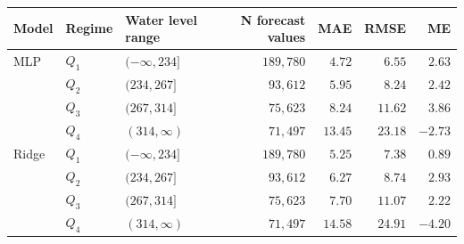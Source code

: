 \begin{tabularx}{\textwidth}{@{}llXrrrr@{}}
\toprule
\textbf{Model} & \textbf{Regime} & \textbf{Water level range} & \textbf{N forecast values} & \textbf{MAE} & \textbf{RMSE} & \textbf{ME} \\
\midrule
MLP & $Q_1$ & $(-\infty, 234]$ & $189{,}780$ & $4.72$ & $6.55$ & $2.63$ \\
\addlinespace
 & $Q_2$ & $(234, 267]$ & $93{,}612$ & $5.95$ & $8.24$ & $2.42$ \\
\addlinespace
 & $Q_3$ & $(267, 314]$ & $75{,}623$ & $8.24$ & $11.62$ & $3.86$ \\
\addlinespace
 & $Q_4$ & $(314, \infty)$ & $71{,}497$ & $13.45$ & $23.18$ & $-2.73$ \\
\addlinespace
Ridge & $Q_1$ & $(-\infty, 234]$ & $189{,}780$ & $5.25$ & $7.38$ & $0.89$ \\
\addlinespace
 & $Q_2$ & $(234, 267]$ & $93{,}612$ & $6.27$ & $8.74$ & $2.93$ \\
\addlinespace
 & $Q_3$ & $(267, 314]$ & $75{,}623$ & $7.70$ & $11.07$ & $2.22$ \\
\addlinespace
 & $Q_4$ & $(314, \infty)$ & $71{,}497$ & $14.58$ & $24.91$ & $-4.20$ \\
\bottomrule
\end{tabularx}
